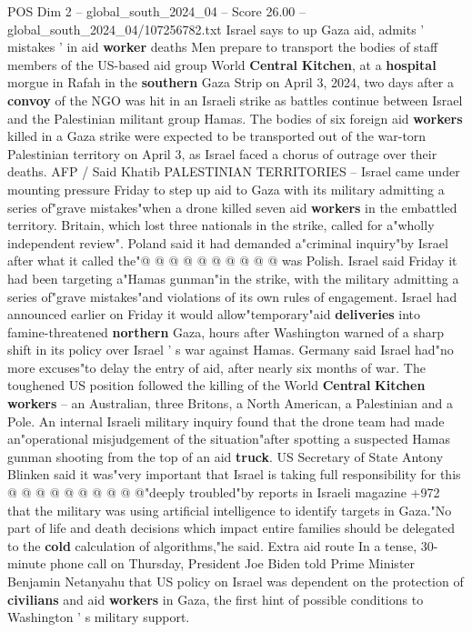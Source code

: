 \begin{textsample}{POS Dim 2 – global\_south\_2024\_04 – Score 26.00 – global\_south\_2024\_04/107256782.txt}  \label{ex:f2_pos_154}
Israel says to up Gaza aid, admits ' mistakes ' in aid \textbf{worker} deaths Men prepare to transport the bodies of staff members of the US-based aid group World \textbf{Central} \textbf{Kitchen}, at a \textbf{hospital} morgue in Rafah in the \textbf{southern} Gaza Strip on April 3, 2024, two days after a \textbf{convoy} of the NGO was hit in an Israeli strike as battles continue between Israel and the Palestinian militant group Hamas.
The bodies of six foreign aid \textbf{workers} killed in a Gaza strike were expected to be transported out of the war-torn Palestinian territory on April 3, as Israel faced a chorus of outrage over their deaths.
AFP / Said Khatib PALESTINIAN TERRITORIES -- Israel came under mounting pressure Friday to step up aid to Gaza with its military admitting a series of"grave mistakes"when a drone killed seven aid \textbf{workers} in the embattled territory.
Britain, which lost three nationals in the strike, called for a"wholly independent review".
Poland said it had demanded a"criminal inquiry"by Israel after what it called the"@ @ @ @ @ @ @ @ @ @ was Polish.
Israel said Friday it had been targeting a"Hamas gunman"in the strike, with the military admitting a series of"grave mistakes"and violations of its own rules of engagement.
Israel had announced earlier on Friday it would allow"temporary"aid \textbf{deliveries} into famine-threatened \textbf{northern} Gaza, hours after Washington warned of a sharp shift in its policy over Israel ' s war against Hamas.
Germany said Israel had"no more excuses"to delay the entry of aid, after nearly six months of war.
The toughened US position followed the killing of the World \textbf{Central} \textbf{Kitchen} \textbf{workers} -- an Australian, three Britons, a North American, a Palestinian and a Pole.
An internal Israeli military inquiry found that the drone team had made an"operational misjudgement of the situation"after spotting a suspected Hamas gunman shooting from the top of an aid \textbf{truck}.
US Secretary of State Antony Blinken said it was"very important that Israel is taking full responsibility for this @ @ @ @ @ @ @ @ @ @"deeply troubled"by reports in Israeli magazine +972 that the military was using artificial intelligence to identify targets in Gaza."No part of life and death decisions which impact entire families should be delegated to the \textbf{cold} calculation of algorithms,"he said.
Extra aid route In a tense, 30-minute phone call on Thursday, President Joe Biden told Prime Minister Benjamin Netanyahu that US policy on Israel was dependent on the protection of \textbf{civilians} and aid \textbf{workers} in Gaza, the first hint of possible conditions to Washington ' s military support.

\end{textsample}
